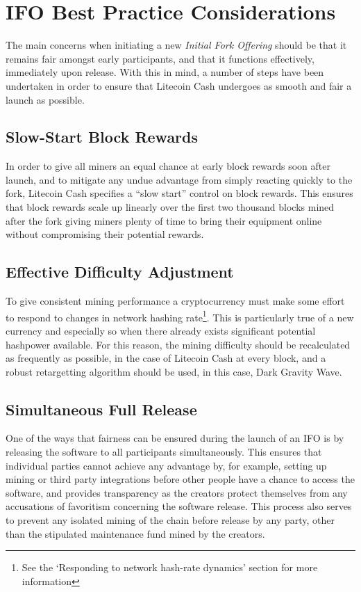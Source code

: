 \documentclass{IOS-Book-Article}
\begin{document}
\section{IFO Best Practice Considerations}

The main concerns when initiating a new \textit{Initial Fork Offering} should be that it remains fair amongst 
early participants, and that it functions effectively, immediately upon release. With this in mind, a number of steps have been undertaken  
in order to ensure that Litecoin Cash undergoes as smooth and fair a launch as possible.
 
\subsection{Slow-Start Block Rewards} 

In order to give all miners an equal chance at early block rewards soon after launch, and to 
mitigate any undue advantage from simply reacting quickly to the fork, Litecoin Cash specifies a
 ``slow start'' control on block rewards. This ensures that block rewards scale up linearly over the first
 two thousand blocks mined after the fork giving miners plenty of time to bring their equipment online without 
 compromising their potential rewards.
 
\subsection{Effective Difficulty Adjustment} 

To give consistent mining performance a cryptocurrency must make some effort to respond to changes in 
network hashing rate\footnote{See the `Responding to network hash-rate dynamics' section for more information}. This 
is particularly true of a new currency and especially so when there already exists significant potential hashpower available. 
 For this reason, the mining difficulty should be recalculated as frequently as possible, in the case of Litecoin Cash at every block, 
 and a robust retargetting algorithm should be used, in this case, Dark Gravity Wave.

\subsection{Simultaneous Full Release}

One of the ways that fairness can be ensured during the launch of an IFO is by releasing the software to all participants simultaneously. 
This ensures that individual parties cannot achieve any advantage by, for example, setting up mining or third party integrations 
before other people have a chance to access the software, and provides transparency as the creators protect themselves from any accusations of 
favoritism concerning the software release. This process also serves to prevent any isolated mining of the chain before 
release by any party, other than the stipulated maintenance fund mined by the creators.
\end{document}
